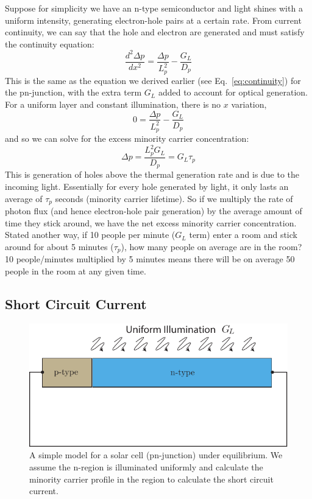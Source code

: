 Suppose for simplicity we have an n-type semiconductor and light shines with a uniform intensity, generating electron-hole pairs at a certain rate.   From current continuity, we can say that the hole and electron are generated and must satisfy the continuity equation:
\begin{equation} 
	\frac{d^2 \Delta p}{dx^2}   = \frac{\Delta p}{L_p^2} - \frac{G_L}{D_p}
\end{equation}
This is the same as the equation we derived earlier (see Eq.~\ref{eq:continuity}) for the pn-junction, with the extra term $G_L$ added to account for optical generation.   For a uniform layer and constant illumination, there is no $x$ variation, 
\begin{equation} 
	0   = \frac{\Delta p}{L_p^2} - \frac{G_L}{D_p}
\end{equation}
and so we can solve for the excess minority carrier concentration:
\begin{equation} 
	\Delta p = \frac{L_p^2 G_L}{D_p} = G_L \tau_p
\end{equation}
This is generation of holes above the thermal generation rate and is due to the incoming light.  Essentially for every hole generated by light, it only lasts an average of $\tau_p$ seconds (minority carrier lifetime).  So if we multiply the rate of photon flux (and hence electron-hole pair generation) by the average amount of time they stick around, we have the net excess minority carrier concentration.   Stated another way, if 10 people per minute ($G_L$ term) enter a room and stick around for about 5 minutes ($\tau_p$), how many people on average are in the room?   10 people/minutes multiplied by 5 minutes means there will be on average 50 people in the room at any given time.  
 



\subsection{Short Circuit Current}

\begin{figure}[tb]
\begin{center}
\includegraphics[width=.5\columnwidth]{pn_solar_cell}
\end{center}
\caption{A simple model for a solar cell (pn-junction) under equilibrium.  We assume the n-region is illuminated uniformly and calculate the minority carrier profile in the region to calculate the short circuit current. } \label{fig:pn_solar_cell}
\end{figure}

